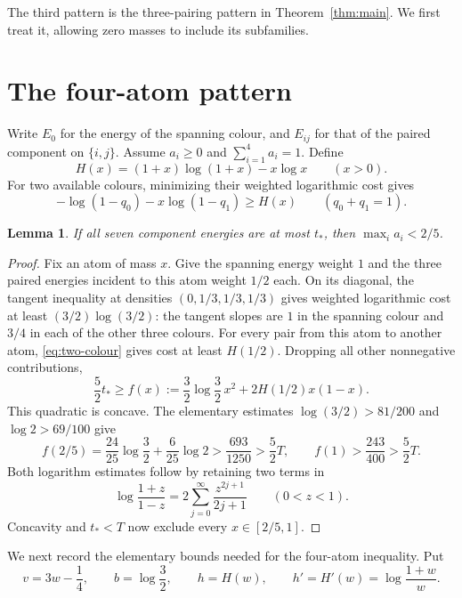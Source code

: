 \documentclass[11pt]{article}
\newtheorem{lemma}[theorem]{Lemma}
\begin{document}
The third pattern is the three-pairing pattern in Theorem~\ref{thm:main}.
We first treat it, allowing zero masses to include its subfamilies.

\section{The four-atom pattern}

Write $E_0$ for the energy of the spanning colour, and $E_{ij}$ for that
of the paired component on $\{i,j\}$. Assume $a_i\ge0$ and
$\sum_{i=1}^4a_i=1$. Define
\[
 H(x)=(1+x)\log(1+x)-x\log x\qquad(x>0).
\]
For two available colours, minimizing their weighted logarithmic cost gives
\begin{equation}\label{eq:two-colour}
 -\log(1-q_0)-x\log(1-q_1)\ge H(x)
 \qquad(q_0+q_1=1).
\end{equation}

\begin{lemma}\label{lem:large-atom}
If all seven component energies are at most $t_*$, then
$\max_i a_i<2/5$.
\end{lemma}
\begin{proof}
Fix an atom of mass $x$. Give the spanning energy weight $1$ and the three
paired energies incident to this atom weight $1/2$ each. On its diagonal,
the tangent inequality at densities $(0,1/3,1/3,1/3)$ gives weighted
logarithmic cost at least $(3/2)\log(3/2)$: the tangent slopes are $1$ in
the spanning colour and $3/4$ in each of the other three colours.
For every pair from this atom to another atom, \eqref{eq:two-colour}
gives cost at least $H(1/2)$. Dropping all other nonnegative contributions,
\[
 \frac52t_*\ge f(x):=
 \frac32\log\frac32\,x^2+2H(1/2)x(1-x).
\]
This quadratic is concave. The elementary estimates
$\log(3/2)>81/200$ and $\log2>69/100$ give
\[
 f(2/5)=\frac{24}{25}\log\frac32+\frac6{25}\log2
 >\frac{693}{1250}>\frac52T,
 \qquad
 f(1)>\frac{243}{400}>\frac52T.
\]
Both logarithm estimates follow by retaining two terms in
\begin{equation}\label{eq:logseries}
 \log\frac{1+z}{1-z}
 =2\sum_{j=0}^{\infty}\frac{z^{2j+1}}{2j+1}\qquad(0<z<1).
\end{equation}
Concavity and $t_*<T$ now exclude every $x\in[2/5,1]$.
\end{proof}

We next record the elementary bounds needed for the four-atom inequality.
Put
\[
 v=3w-\frac14,\qquad b=\log\frac32,
 \qquad h=H(w),\qquad h'=H'(w)=\log\frac{1+w}{w}.
\]
\end{document}
